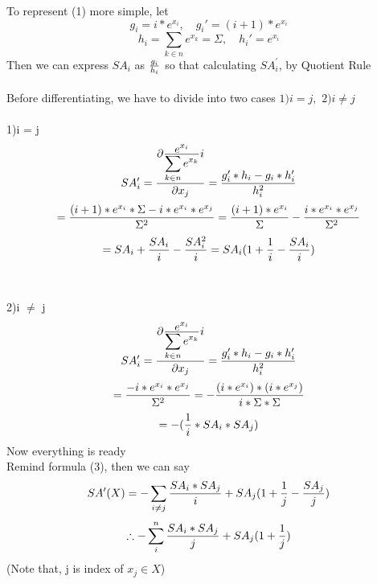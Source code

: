 \documentclass{article}
\begin{document}
To represent (1) more simple, let
\begin{equation}                                                %
    g_i = i*e^{x_i},\quad g_i\prime = (i+1)*e^{x_i}
\end{equation}
\begin{equation}
    h_i = \sum_{k \in n} e^{x_k} = \Sigma,\quad h_i\prime = e^{x_i}
\end{equation}
Then we can express $SA_i$ as ${g_i \over h_i}$ so that calculating $SA_i^\prime$, by Quotient Rule
\\\\
Before differentiating, we have to divide into two cases $1) i = j,\,\,2) i \ne j$ 
\\\\
{\large 1)i = j}
\begin{equation}
    SA_i^\prime=
    {{\partial \frac {\displaystyle e^{x_i}} {\displaystyle \sum_{k \in n} e^{x_k}}} i
    \over \partial x_j}=
    {g_i^\prime*h_i-g_i*h_i^\prime \over h_i^2}
\end{equation}
\begin{equation}
    ={(i+1)*e^{x_i}*\Sigma-i*e^{x_i}*e^{x_j} \over \Sigma^2}=
    {(i+1)*e^{x_i} \over \Sigma}-{i*e^{x_i}*e^{x_j} \over \Sigma^2}
\end{equation}
\begin{equation}
    =SA_i+{SA_i \over i}-{SA_i^2 \over i}=SA_i(1+{1 \over i}-{SA_i \over i})
\end{equation}
\\\\
{\large 2)i $\ne$ j}
\begin{equation}
    SA_i^\prime=
    {{\partial \frac {\displaystyle e^{x_i}} {\displaystyle \sum_{k \in n} e^{x_k}}} i
    \over \partial x_j}=
    {g_i^\prime*h_i-g_i*h_i^\prime \over h_i^2}
\end{equation}
\begin{equation}
    ={-i*e^{x_i}*e^{x_j} \over \Sigma^2}=-{(i*e^{x_i})*(i*e^{x_j}) \over i*\Sigma*\Sigma}
\end{equation}
\begin{equation}
    =-({1 \over i}*SA_i*SA_j)
\end{equation}
Now everything is ready
\\
Remind formula (3), then we can say
\begin{equation}
    SA^\prime(X)=-\sum_{i\ne j} {SA_i*SA_j \over i} + SA_j(1+{1 \over j}-{SA_j \over j})
\end{equation}
\begin{equation}
    \therefore -\sum_i^n {SA_i*SA_j \over j}+SA_j(1+{1 \over j})
\end{equation}
(\small Note that, j is index of $x_j \in X$)
\end{document}
